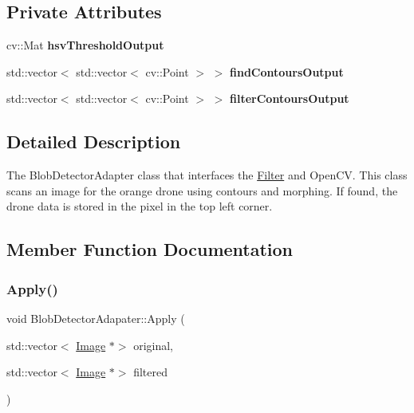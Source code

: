 \subsection*{Private Attributes}
\begin{DoxyCompactItemize}
\item 
\mbox{\label{classBlobDetectorAdapater_a544feb9ee51956c0569a24b59a2b737d}} 
cv\+::\+Mat {\bfseries hsv\+Threshold\+Output}
\item 
\mbox{\label{classBlobDetectorAdapater_a4b59201e9c38c68bf833cc27ec9747dd}} 
std\+::vector$<$ std\+::vector$<$ cv\+::\+Point $>$ $>$ {\bfseries find\+Contours\+Output}
\item 
\mbox{\label{classBlobDetectorAdapater_ad8418b4a8984b5db6fab8c8e7bd3ddbb}} 
std\+::vector$<$ std\+::vector$<$ cv\+::\+Point $>$ $>$ {\bfseries filter\+Contours\+Output}
\end{DoxyCompactItemize}


\subsection{Detailed Description}
The Blob\+Detector\+Adapter class that interfaces the \hyperlink{classFilter}{Filter} and Open\+CV. This class scans an image for the orange drone using contours and morphing. If found, the drone data is stored in the pixel in the top left corner. 

\subsection{Member Function Documentation}
\mbox{\label{classBlobDetectorAdapater_a24f99498567e7b20b58a62aba78a759c}} 
\subsubsection{\texorpdfstring{Apply()}{Apply()}}
{\footnotesize\ttfamily void Blob\+Detector\+Adapater\+::\+Apply (\begin{DoxyParamCaption}\item[{std\+::vector$<$ \hyperlink{classImage}{Image} $\ast$$>$}]{original,  }\item[{std\+::vector$<$ \hyperlink{classImage}{Image} $\ast$$>$}]{filtered }\end{DoxyParamCaption})\hspace{0.3cm}{\ttfamily [virtual]}}



